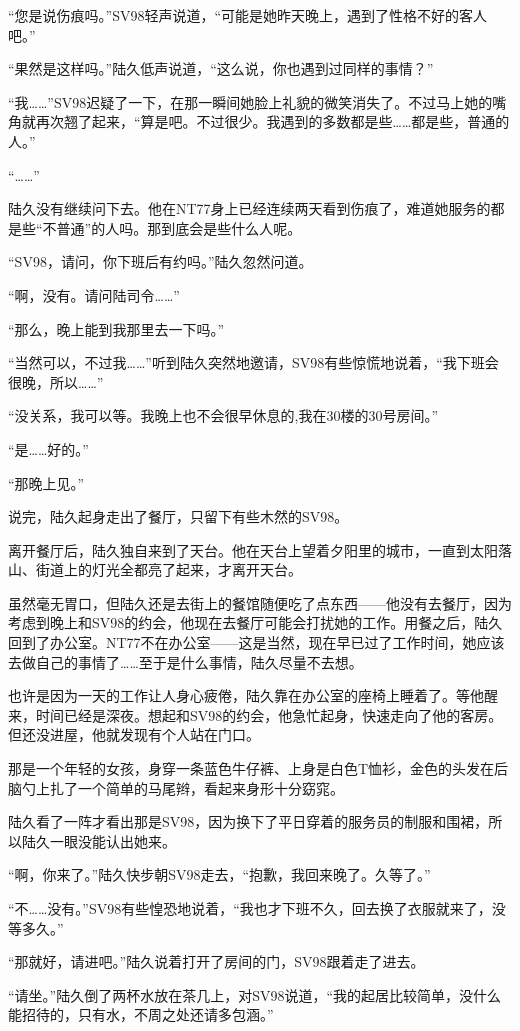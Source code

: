 “您是说伤痕吗。”SV98轻声说道，“可能是她昨天晚上，遇到了性格不好的客人吧。”

“果然是这样吗。”陆久低声说道，“这么说，你也遇到过同样的事情？”

“我……”SV98迟疑了一下，在那一瞬间她脸上礼貌的微笑消失了。不过马上她的嘴角就再次翘了起来，“算是吧。不过很少。我遇到的多数都是些……都是些，普通的人。”

“……”

陆久没有继续问下去。他在NT77身上已经连续两天看到伤痕了，难道她服务的都是些“不普通”的人吗。那到底会是些什么人呢。

 “SV98，请问，你下班后有约吗。”陆久忽然问道。

“啊，没有。请问陆司令……”

“那么，晚上能到我那里去一下吗。”

“当然可以，不过我……”听到陆久突然地邀请，SV98有些惊慌地说着，“我下班会很晚，所以……”

“没关系，我可以等。我晚上也不会很早休息的,我在30楼的30号房间。”

“是……好的。”

“那晚上见。”

说完，陆久起身走出了餐厅，只留下有些木然的SV98。

离开餐厅后，陆久独自来到了天台。他在天台上望着夕阳里的城市，一直到太阳落山、街道上的灯光全都亮了起来，才离开天台。

虽然毫无胃口，但陆久还是去街上的餐馆随便吃了点东西——他没有去餐厅，因为考虑到晚上和SV98的约会，他现在去餐厅可能会打扰她的工作。用餐之后，陆久回到了办公室。NT77不在办公室——这是当然，现在早已过了工作时间，她应该去做自己的事情了……至于是什么事情，陆久尽量不去想。

也许是因为一天的工作让人身心疲倦，陆久靠在办公室的座椅上睡着了。等他醒来，时间已经是深夜。想起和SV98的约会，他急忙起身，快速走向了他的客房。但还没进屋，他就发现有个人站在门口。

那是一个年轻的女孩，身穿一条蓝色牛仔裤、上身是白色T恤衫，金色的头发在后脑勺上扎了一个简单的马尾辫，看起来身形十分窈窕。

陆久看了一阵才看出那是SV98，因为换下了平日穿着的服务员的制服和围裙，所以陆久一眼没能认出她来。

“啊，你来了。”陆久快步朝SV98走去，“抱歉，我回来晚了。久等了。”

“不……没有。”SV98有些惶恐地说着，“我也才下班不久，回去换了衣服就来了，没等多久。”

“那就好，请进吧。”陆久说着打开了房间的门，SV98跟着走了进去。

“请坐。”陆久倒了两杯水放在茶几上，对SV98说道，“我的起居比较简单，没什么能招待的，只有水，不周之处还请多包涵。”

